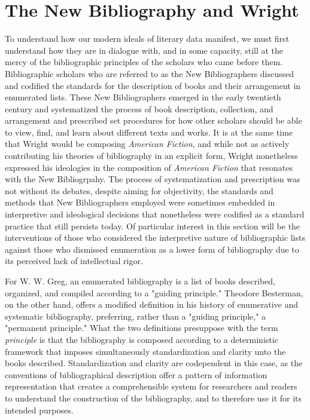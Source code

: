 \section{The New Bibliography and Wright}

To understand how our modern ideals of literary data manifest, we must first understand how they are in dialogue with, and in some capacity, still at the mercy of the bibliographic principles of the scholars who came before them. Bibliographic scholars who are referred to as the New Bibliographers discussed and codified the standards for the description of books and their arrangement in enumerated lists. These New Bibliographers emerged in the early twentieth century and systematized the process of book description, collection, and arrangement and prescribed set procedures for how other scholars should be able to view, find, and learn about different texts and works. It is at the same time that Wright would be composing \textit{American Fiction}, and while not as actively contributing his theories of bibliography in an explicit form, Wright nonetheless expressed his ideologies in the composition of \textit{American Fiction} that resonates with the New Bibliogrpahy. The process of systematization and prescription was not without its debates, despite aiming for objectivity, the standards and methods that New Bibliographers employed were sometimes embedded in interpretive and ideological decisions that nonetheless were codified as a standard practice that still persists today. Of particular interest in this section will be the interventions of those who considered the interpretive nature of bibliographic lists against those who dismissed enumeration as a lower form of bibliography due to its perceived lack of intellectual rigor. 

For W. W. Greg, an enumerated bibliography is a list of books described, organized, and compiled according to a "guiding principle."\autocite[41]{greg_what_1913} Theodore Besterman, on the other hand, offers a modified definition in his history of enumerative and systematic bibliography, preferring, rather than a "guiding principle," a "permanent principle." \autocite[2]{theodore_besterman_beginnings_1968} What the two definitions presuppose with the term \textit{principle} is that the bibliography is composed according to a deterministic framework that imposes simultaneously standardization and clarity unto the books described. Standardization and clarity are codependent in this case, as the conventions of bibliographical description offer a pattern of information representation that creates a comprehensible system for researchers and readers to understand the construction of the bibliography, and to therefore use it for its intended purposes. 

